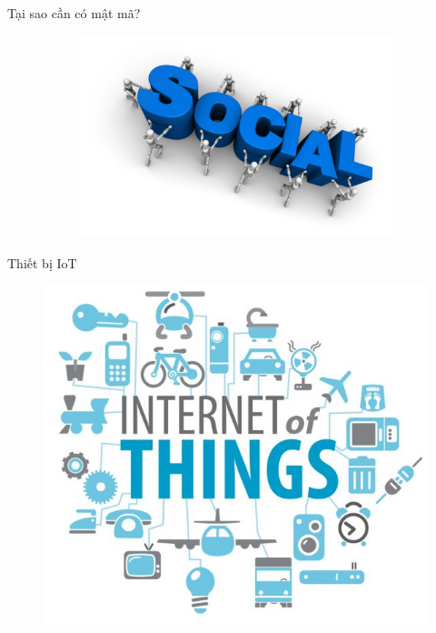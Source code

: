 \documentclass[compress]{beamer}
\begin{document}
\begin{frame}{Tại sao cần có mật mã?}
\begin{figure}[h]
\begin{subfigure}{.35\textwidth}
\end{subfigure}
\begin{subfigure}{.35\textwidth}
  \centering
  \includegraphics[width=1\linewidth]{../soical.jpeg}
  \label{fig:sfig2}
\end{subfigure}
\label{fig:fig}
\end{figure}
\end{frame}
\begin{frame}{Thiết bị IoT}
\begin{figure}[h]
\centering
\includegraphics[width=0.8\linewidth]{../iot.jpg}
\end{figure}
\end{frame}
\end{document}
